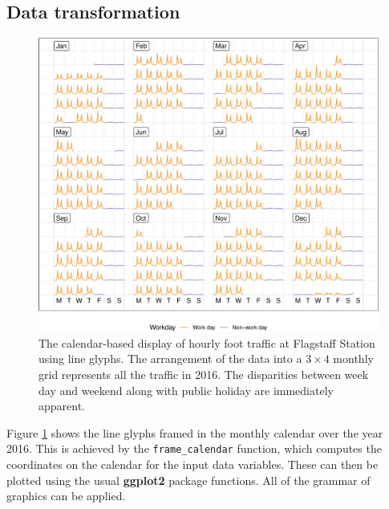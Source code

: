 \documentclass[12pt]{article}
\begin{document}
\label{sec:algorithm}

\hypertarget{data-transformation}{%
\subsection{Data transformation}\label{data-transformation}}

\label{sec:transformation}

\begin{figure}

{\centering \includegraphics[width=\textwidth]{figure/fs-2016-1} 

}

\caption{The calendar-based display of hourly foot traffic at Flagstaff Station using line glyphs. The arrangement of the data into a $3 \times 4$ monthly grid represents all the traffic in 2016. The disparities between week day and weekend along with public holiday are immediately apparent.}\label{fig:fs-2016}
\end{figure}

Figure \ref{fig:fs-2016} shows the line glyphs framed in the monthly
calendar over the year 2016. This is achieved by the
\texttt{frame\_calendar} function, which computes the coordinates on the
calendar for the input data variables. These can then be plotted using
the usual \textbf{ggplot2} package \citep{R-ggplot2} functions. All of
the grammar of graphics \citep{wilkinson2006grammar, wickham2009ggplot2}
can be applied.
\end{document}
